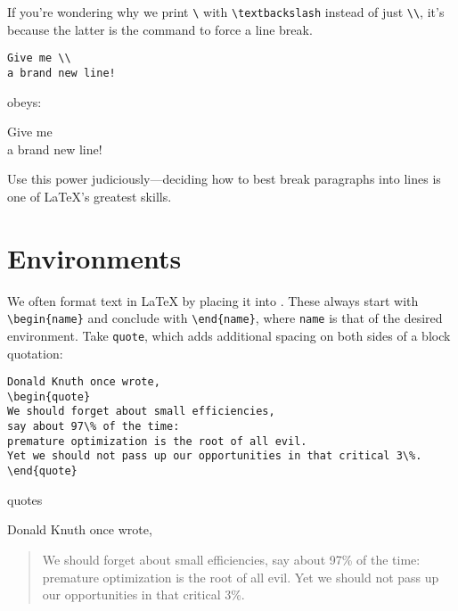 If you're wondering why we print \texttt{\textbackslash} with
\verb|\textbackslash| instead of just \verb|\\|,
it's because the latter is the command to force a line break.
\begin{leftfigure}
\begin{lstlisting}
Give me \\
a brand new line!
\end{lstlisting}
\end{leftfigure}
obeys:
\begin{leftfigure}
\lm Give me \\
a brand new line!
\end{leftfigure}
Use this power judiciously---deciding how to best break paragraphs into lines
is one of \LaTeX{}'s greatest skills.

\section{Environments}

We often format text in \LaTeX{} by placing it into .
These always start with \verb|\begin{name}| and conclude with \verb|\end{name}|,
where \texttt{name} is that of the desired environment.
Take \texttt{quote}, which adds additional spacing on both sides of a block
quotation:
\begin{leftfigure}
\begin{lstlisting}
Donald Knuth once wrote,
\begin{quote}
We should forget about small efficiencies,
say about 97\% of the time:
premature optimization is the root of all evil.
Yet we should not pass up our opportunities in that critical 3\%.
\end{quote}
\end{lstlisting}
\end{leftfigure}
quotes
\begin{leftfigure}
\lm
Donald Knuth once wrote,
\begin{quote}
We should forget about small efficiencies,
say about 97\% of the time:
premature optimization is the root of all evil.
Yet we should not pass up our opportunities in that critical 3\%.
\end{quote}
\end{leftfigure}

